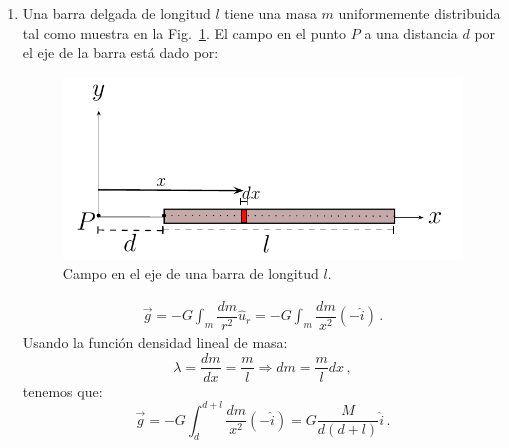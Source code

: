\begin{enumerate}

\item Una barra delgada de longitud $l$ tiene una masa $m$ uniformemente distribuida tal como muestra en la Fig.~\ref{fig:gravitacion-barra1}. El campo en el punto $P$ a una distancia $d$ por el eje de la barra está dado por:
\begin{figure}[h]
\begin{center}
\includegraphics[scale=0.8]{gravitacion/barra1}
\end{center}
\caption{Campo en el eje de una barra de longitud $l$.}
\label{fig:gravitacion-barra1}
\end{figure}

\begin{eqnarray}
\vec{g}=-G\int_m \dfrac{dm}{r^2}\hat{u}_r = -G\int_m \dfrac{dm}{x^2}(-\hat{i})\,.
\end{eqnarray}
Usando la función densidad lineal de masa:
\begin{displaymath}
\lambda=\dfrac{dm}{dx}=\dfrac{m}{l} \Rightarrow dm=\dfrac{m}{l}dx\,, 
\end{displaymath}
tenemos que:
\begin{equation}
\vec{g}= -G\int_d^{d+l} \dfrac{dm}{x^2}(-\hat{i})=G \dfrac{M}{d(d+l)}\hat{i}\,.
\end{equation}


\end{enumerate}

